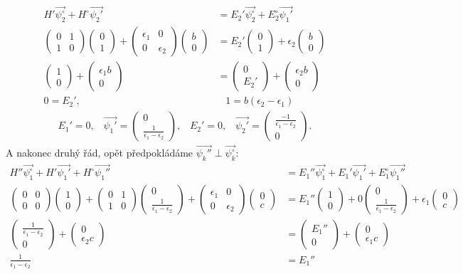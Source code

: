 \documentclass[10pt,a4paper]{article}
\def\ph{\phantom}
\newcommand{\mat}[1]{
    \begin{pmatrix}
        #1
    \end{pmatrix}
}
\begin{document}
\begin{align*}
    H' \vec{\psi_2^{\circ}} + H^{\circ} \vec{\psi_2'} &= E_2' \vec{\psi_2^{\circ}} + E^{\circ}_2 \vec{\psi_1'}
    \\[5pt]
    \mat{0&1\\1&0} \mat{0\\1} +
    \mat{\epsilon_1&0\\0&\epsilon_2}\mat{b\\0}
    &=
    E_2'\mat{0\\1} + \epsilon_2\mat{b\\0}
    \\[5pt]
    \mat{1\\0} + \mat{\epsilon_1 b\\0}
    &=
    \mat{0\\E_2'} + \mat{\epsilon_2 b\\0}
    \\[5pt]
    0 = E_2', \;\;\; &\ph{} \;\;\; 1 = b(\epsilon_2 - \epsilon_1)
\end{align*}
\begin{align*}
    E_1' = 0, \;\;\;
    \vec{\psi_1'} = \mat{0 \\ \frac{1}{\epsilon_1 - \epsilon_2}}, \;\;\;
    E_2' = 0, \;\;\;
    \vec{\psi_2'} = \mat{\frac{-1}{\epsilon_1 - \epsilon_2} \\ 0}.
\end{align*}
A nakonec druhý řád, opět předpokládáme $\vec{\psi_k''} \perp \vec{\psi^{\circ}_k}$:
\begin{align*}
    H'' \vec{\psi_1^{\circ}} + H' \vec{\psi_1'} + H^{\circ} \vec{\psi_1''} &= E_1'' \vec{\psi_1^{\circ}} + E_1' \vec{\psi_1'} + E^{\circ}_1 \vec{\psi_1''}
    \\[5pt]
    \mat{0&0\\0&0} \mat{1\\0} +
    \mat{0&1\\1&0} \mat{0 \\ \frac{1}{\epsilon_1 - \epsilon_2}} +
    \mat{\epsilon_1&0\\0&\epsilon_2} \mat{0\\c}
    &=
    E_1'' \mat{1\\0} +
    0 \mat{0 \\ \frac{1}{\epsilon_1 - \epsilon_2}} +
    \epsilon_1 \mat{0\\c}
    \\[5pt]
    \mat{\frac{1}{\epsilon_1 - \epsilon_2} \\ 0} +
    \mat{0 \\ \epsilon_2 c}
    &=
    \mat{E_1'' \\ 0} +
    \mat{0 \\ \epsilon_1 c}
    \\[5pt]
    \frac{1}{\epsilon_1 - \epsilon_2} &= E_1''
\end{align*}
\end{document}
